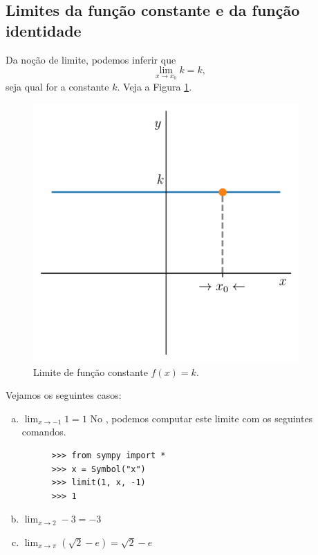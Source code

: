 \subsection{Limites da função constante e da função identidade}\label{sslfc}

Da noção de limite, podemos inferir que
\begin{equation}
  \lim_{x\to x_0} k = k,
\end{equation}
seja qual for a constante $k$. Veja a Figura \ref{fig:lim_funk}.

\begin{figure}[H]
  \centering
  \includegraphics[width=4in]{./cap_lim/dados/fig_lim_funk/fig.png}
  \caption{Limite de função constante $f(x) = k$.}
  \label{fig:lim_funk}
\end{figure}

\begin{ex}
  Vejamos os seguintes casos:
  \begin{enumerate}[a)]
  \item $\displaystyle \lim_{x\to -1} 1 = 1$
    \ifispython
    No {\python}, podemos computar este limite com os seguintes comandos.
    \begin{lstlisting}
      >>> from sympy import *
      >>> x = Symbol("x")
      >>> limit(1, x, -1)
      >>> 1
    \end{lstlisting}
    \fi
  \item $\displaystyle \lim_{x\to 2} -3 = -3$
  \item $\displaystyle \lim_{x\to \pi} \left(\sqrt{2} - e\right) = \sqrt{2}-e$
  \end{enumerate}
\end{ex}


